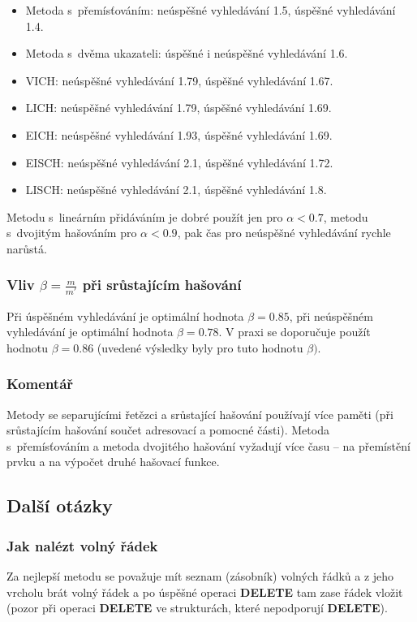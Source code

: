 \documentclass[a4paper,12pt]{article}
\newenvironment{pitemize}{
 \begin{itemize}
   \setlength{\itemsep}{1pt}
   \setlength{\parskip}{0pt}
   \setlength{\parsep}{0pt}
 }{\end{itemize}}
\begin{document}
\begin{pitemize}
\item Metoda s~přemísťováním: neúspěšné vyhledávání 1.5, úspěšné 
vyhledávání 1.4. 
\item Metoda s~dvěma ukazateli: úspěšné i neúspěšné vyhledávání  1.6. 
\item VICH: neúspěšné vyhledávání 1.79, úspěšné vyhledávání 
1.67. 
\item LICH: neúspěšné vyhledávání 1.79, úspěšné vyhledávání 
1.69. 
\item EICH: neúspěšné vyhledávání 1.93, úspěšné vyhledávání 
1.69. 
\item EISCH: neúspěšné vyhledávání 2.1, úspěšné vyhledávání 
1.72. 
\item LISCH: neúspěšné vyhledávání 2.1, úspěšné vyhledávání 
1.8.
\end{pitemize}

Metodu s~lineárním přidáváním je dobré použít jen pro 
$\alpha <0.7$, metodu s~dvojitým hašováním pro $\alpha 
<0.9$, pak 
čas pro neúspěšné vyhledávání rychle narůstá.

\subsubsection{Vliv $\beta =\frac m{m'}$ při srůstajícím hašování}
Při 
úspěšném vy\-hledávání je optimální hodnota $
\beta =0.85$, při 
neúspěšném vy\-hledávání je optimální hodnota $
\beta =0.78$. 
V praxi se doporučuje použít hodnotu $\beta =0.86$ (uvedené 
výsledky byly pro tuto hodnotu $\beta ).$

\subsubsection{Komentář}
Metody se separujícími řetězci a 
srůstající hašování používají více paměti (při 
srůstajícím hašování součet adresovací a 
pomocné části). Metoda s~přemísťováním a metoda 
dvojitého hašování vyžadují více času -- na přemístění 
prvku a na výpočet druhé hašovací funkce.

\subsection{Další otázky}

\subsubsection{Jak nalézt volný řádek}
Za nejlepší metodu se považuje mít seznam (zásobník) 
volných řádků a z jeho vrcholu brát volný řádek 
a po úspěšné operaci {\bf DELETE} tam zase řádek vložit 
(pozor při operaci {\bf DELETE} ve strukturách, které 
nepodporují {\bf DELETE}).
\end{document}
